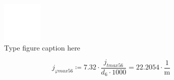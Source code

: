 \documentclass{article}
\newcommand{\defeq}{\coloneq} %
\begin{document}
\begin{figure}[h!]
 \begin{center}
  \includegraphics[max width=\textwidth]{calculations/884.png}
  \caption{Type figure caption here}
  \label{fig:884}
 \end{center}
\end{figure}
\begin{equation*}
\textit{j}_{\textit{φmax56}} \defeq 7.32 \cdot \frac{\textit{j}_{\textit{tmax56}}}{\textit{d}_{\textit{6}} \cdot 1000} = {22.2054 \cdot \frac{1}{\mathrm{m}}}
\end{equation*}
\end{document}
